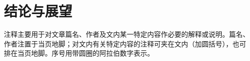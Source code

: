 
\chapter{结论与展望}

注释主要用于对文章篇名、作者及文内某一特定内容作必要的解释或说明。篇名、作者注置于当页地脚；对文内有关特定内容的注释可夹在文内（加圆括号），也可排在当页地脚。序号用带圆圈的阿拉伯数字表示。
